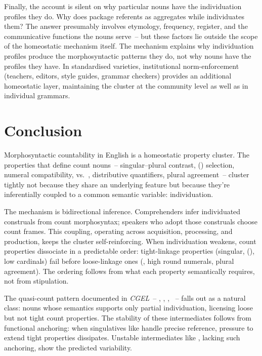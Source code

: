 \documentclass[12pt,a4paper]{article}
\begin{document}
Finally, the account is silent on why particular nouns have the individuation profiles they do. Why does  package referents as aggregates while  individuates them? The answer presumably involves etymology, frequency, register, and the communicative functions the nouns serve~-- but these factors lie outside the scope of the homeostatic mechanism itself. The mechanism explains why individuation profiles produce the morphosyntactic patterns they do, not why nouns have the profiles they have. In standardised varieties, institutional norm-enforcement (teachers, editors, style guides, grammar checkers) provides an additional homeostatic layer, maintaining the cluster at the community level as well as in individual grammars.

\section{Conclusion}

Morphosyntactic countability in English is a homeostatic property cluster. The properties that define count nouns~-- singular--plural contrast, () selection, numeral compatibility,  vs.\ , distributive quantifiers, plural agreement~-- cluster tightly not because they share an underlying feature but because they're inferentially coupled to a common semantic variable: individuation.

The mechanism is bidirectional inference. Comprehenders infer individuated construals from count morphosyntax; speakers who adopt those construals choose count frames. This coupling, operating across acquisition, processing, and production, keeps the cluster self-reinforcing. When individuation weakens, count properties dissociate in a predictable order: tight-linkage properties (singular, (), low cardinals) fail before loose-linkage ones (, high round numerals, plural agreement). The ordering follows from what each property semantically requires, not from stipulation.

The quasi-count pattern documented in \textit{CGEL}~-- , , , ~-- falls out as a natural class: nouns whose semantics supports only partial individuation, licensing loose but not tight count properties. The stability of these intermediates follows from functional anchoring: when singulatives like  handle precise reference, pressure to extend tight properties dissipates. Unstable intermediates like , lacking such anchoring, show the predicted variability.
\end{document}
